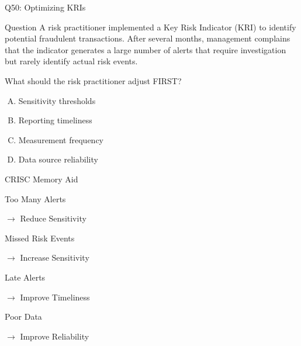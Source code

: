 \documentclass{beamer}
\begin{document}
	
	\begin{frame}[shrink=10]{Q50: Optimizing KRIs}
		\begin{block}{Question}
			A risk practitioner implemented a Key Risk Indicator (KRI)
			to identify potential fraudulent transactions. After several
			months, management complains that the indicator generates a
			large number of alerts that require investigation but rarely
			identify actual risk events.
			
			What should the risk practitioner adjust FIRST?
		\end{block}
		
		\begin{enumerate}[(A)]
			\item Sensitivity thresholds
			\item Reporting timeliness
			\item Measurement frequency
			\item Data source reliability
		\end{enumerate}
				\begin{block}{CRISC Memory Aid}
			
			Too Many Alerts
			
			$\rightarrow$ Reduce Sensitivity
			
			\vspace{0.1cm}
			
			Missed Risk Events
			
			$\rightarrow$ Increase Sensitivity
			
			\vspace{0.1cm}
			
			Late Alerts
			
			$\rightarrow$ Improve Timeliness
			
			\vspace{0.1cm}
			
			Poor Data
			
			$\rightarrow$ Improve Reliability
			
		\end{block}
		
	\end{frame}
	
\end{document}
